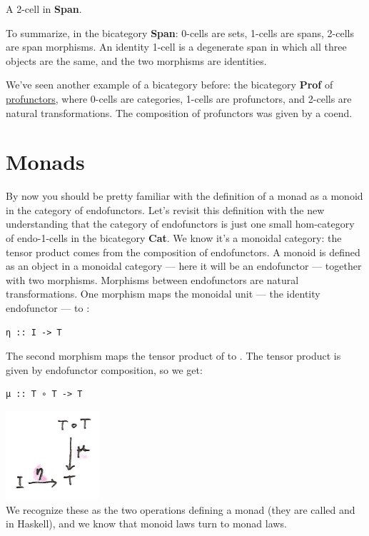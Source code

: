 A 2-cell in \textbf{Span}.

To summarize, in the bicategory \textbf{Span}: 0-cells are sets, 1-cells
are spans, 2-cells are span morphisms. An identity 1-cell is a
degenerate span in which all three objects are the same, and the two
morphisms are identities.

We've seen another example of a bicategory before: the bicategory
\textbf{Prof} of
\href{https://bartoszmilewski.com/2017/03/29/ends-and-coends/}{profunctors},
where 0-cells are categories, 1-cells are profunctors, and 2-cells are
natural transformations. The composition of profunctors was given by a
coend.

\section{Monads}\label{monads}

By now you should be pretty familiar with the definition of a monad as a
monoid in the category of endofunctors. Let's revisit this definition
with the new understanding that the category of endofunctors is just one
small hom-category of endo-1-cells in the bicategory \textbf{Cat}. We
know it's a monoidal category: the tensor product comes from the
composition of endofunctors. A monoid is defined as an object in a
monoidal category --- here it will be an endofunctor  ---
together with two morphisms. Morphisms between endofunctors are natural
transformations. One morphism maps the monoidal unit --- the identity
endofunctor --- to :

\begin{verbatim}
η :: I -> T
\end{verbatim}

The second morphism maps the tensor product of  to
. The tensor product is given by endofunctor composition, so
we get:

\begin{verbatim}
μ :: T ∘ T -> T
\end{verbatim}

\includegraphics[width=1.35417in]{images/monad.png}\\
We recognize these as the two operations defining a monad (they are
called  and  in Haskell), and we know that
monoid laws turn to monad laws.

